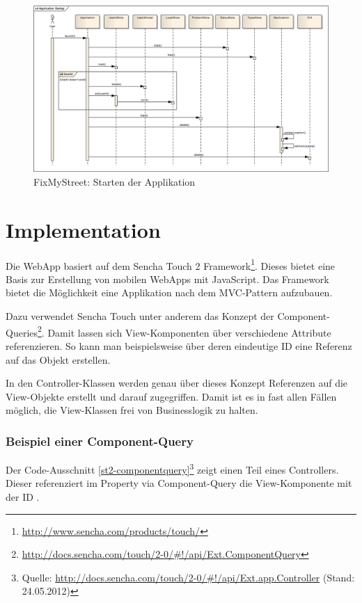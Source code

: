\begin{figure}[H]
	\centering
	\includegraphics[width=\textwidth]{images/usecase2-fixmystreet/uml/fixmystreet-sequencediagram-applicationstartup}
	\caption{FixMyStreet: Starten der Applikation}
	\label{fixmystreet-sequencediagram-applicationstartup}
\end{figure}

\section{Implementation}
Die \gls{WebApp} basiert auf dem Sencha Touch 2 Framework\footnote{\url{http://www.sencha.com/products/touch/}}. Dieses bietet eine Basis zur Erstellung von mobilen \gls{WebApp}s mit JavaScript. Das Framework bietet die Möglichkeit eine Applikation nach dem \gls{MVC}-Pattern aufzubauen.

Dazu verwendet Sencha Touch unter anderem das Konzept der Component-Queries\footnote{\url{http://docs.sencha.com/touch/2-0/\#!/api/Ext.ComponentQuery}}. Damit lassen sich View-Komponenten über verschiedene Attribute referenzieren. So kann man beispielsweise über deren eindeutige ID eine Referenz auf das Objekt erstellen.

In den Controller-Klassen werden genau über dieses Konzept Referenzen auf die View-Objekte erstellt und darauf zugegriffen. Damit ist es in fast allen Fällen möglich, die View-Klassen frei von Businesslogik zu halten.

\subsubsection{Beispiel einer Component-Query}
Der Code-Ausschnitt \ref{st2-componentquery}\footnote{Quelle: \url{http://docs.sencha.com/touch/2-0/\#!/api/Ext.app.Controller} (Stand: 24.05.2012)} zeigt einen Teil eines Controllers. Dieser referenziert im Property  via Component-Query die View-Komponente mit der ID .

